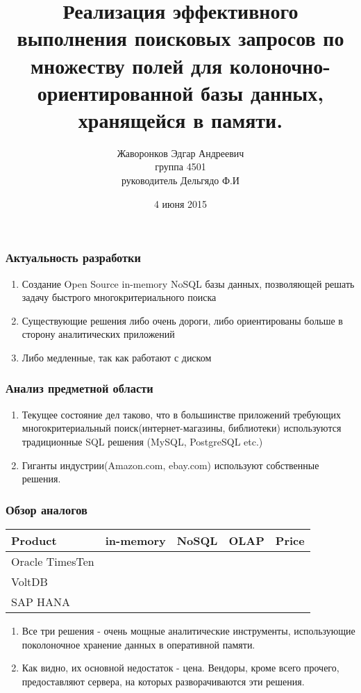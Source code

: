 \documentclass{beamer}
\begin{document}
\title{Реализация эффективного выполнения поисковых запросов по множеству полей для колоночно-ориентированной базы данных, хранящейся в памяти.}
\author{Жаворонков Эдгар Андреевич \\ группа 4501 \\ руководитель Дельгядо Ф.И}
\date{4 июня 2015}

\frame{\titlepage}

\begin{frame}\frametitle{Актуальность разработки}
    \begin{enumerate}
        \item Создание Open Source in-memory NoSQL базы данных, позволяющей решать задачу быстрого многокритериального поиска
        \item Существующие решения либо очень дороги, либо ориентированы больше в сторону аналитических приложений
        \item <2-> Либо медленные, так как работают с диском
    \end{enumerate}
\end{frame}

\begin{frame}\frametitle{Анализ предметной области}
    \begin{enumerate}
        \item Текущее состояние дел таково, что в большинстве приложений требующих многокритериальный поиск(интернет-магазины, библиотеки) используются традиционные SQL решения (MySQL, PostgreSQL etc.) 
        \item Гиганты индустрии(Amazon.com, ebay.com) используют собственные решения.
    \end{enumerate}
\end{frame}

\begin{frame}\frametitle{Обзор аналогов}
    \begin{tabular}{| l | c | c | c | c |}
        \hline
        Product & in-memory & NoSQL & OLAP & Price \\
        \hline
        Oracle TimesTen & \color{green}{\checkmark} & \color{green}{\checkmark} & \color{green}{\checkmark} & \color{red}{€19,969.00} \\
        \hline 
        VoltDB          & \color{green}{\checkmark} & \color{green}{\checkmark} & \color{green}{\checkmark} & \color{red}{\$3500/month} \\
        \hline
        SAP HANA        & \color{green}{\checkmark} & \color{green}{\checkmark} & \color{green}{\checkmark} & \color{red}{\$3595/month}\\
        \hline
    \end{tabular}
    \begin{enumerate}
        \item Все три решения - очень мощные аналитические инструменты, использующие поколоночное хранение данных в оперативной памяти. 
        \item Как видно, их основной недостаток - цена. Вендоры, кроме всего прочего, предоставляют сервера, на которых разворачиваются эти решения. 
    \end{enumerate}
\end{frame}
\end{document}
